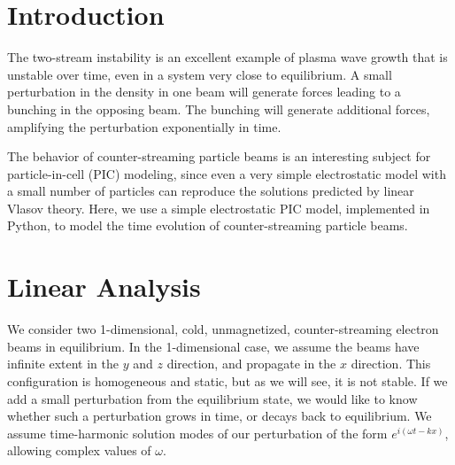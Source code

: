 \documentclass[%
 reprint,
 amsmath,amssymb,
 aps,
]{revtex4-2}
\begin{document}
\maketitle



\section{Introduction}

The two-stream instability is an excellent example of plasma wave growth that is unstable over time, even in a system very close to equilibrium. A small perturbation in the density in one beam will generate forces leading to a bunching in the opposing beam. The bunching will generate additional forces, amplifying the perturbation exponentially in time.

The behavior of counter-streaming particle beams is an interesting subject for particle-in-cell (PIC) modeling, since even a very simple electrostatic model with a small number of particles can reproduce the solutions predicted by linear Vlasov theory. Here, we use a simple electrostatic PIC model, implemented in Python, to model the time evolution of counter-streaming particle beams.

\section{Linear Analysis}

We consider two 1-dimensional, cold, unmagnetized, counter-streaming electron beams in equilibrium. In the 1-dimensional case, we assume the beams have infinite extent in the $y$ and $z$ direction, and propagate in the $x$ direction. This configuration is homogeneous and static, but as we will see, it is not stable. If we add a small perturbation from the equilibrium state, we would like to know whether such a perturbation grows in time, or decays back to equilibrium. We assume time-harmonic solution modes of our perturbation of the form $e^{i (\omega t - k x)}$, allowing complex values of $\omega$.
\end{document}
